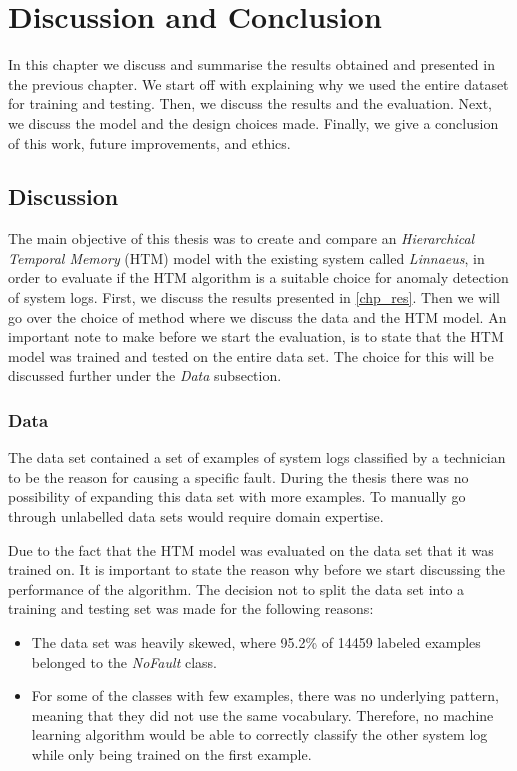 \chapter{Discussion and Conclusion}
\label{chp_disc}
In this chapter we discuss and summarise the results obtained and presented in the previous chapter. We start off with explaining why we used the entire dataset for training and testing. Then, we discuss the results and the evaluation. Next, we discuss the model and the design choices made. Finally, we give a conclusion of this work, future improvements, and ethics. 


\section{Discussion}
The main objective of this thesis was to create and compare an \textit{Hierarchical Temporal Memory} (HTM) model with the existing system called \textit{Linnaeus}, in order to evaluate if the HTM algorithm is a suitable choice for anomaly detection of system logs. First, we discuss the results presented in \autoref{chp_res}. Then we will go over the choice of method where we discuss the data and the HTM model. An important note to make before we start the evaluation, is to state that the HTM model was trained and tested on the entire data set. The choice for this will be discussed further under the \textit{Data} subsection.  

\subsection{Data}
The data set contained a set of examples of system logs classified by a technician to be the reason for causing a specific fault. During the thesis there was no possibility of expanding this data set with more examples. To manually go through unlabelled data sets would require domain expertise. 

Due to the fact that the HTM model was evaluated on the data set that it was trained on. It is important to state the reason why before we start discussing the performance of the algorithm. The decision not to split the data set into a training and testing set was made for the following reasons:

\begin{itemize}
    
    \item The data set was heavily skewed, where 95.2\% of 14459 labeled examples belonged to the \textit{NoFault} class.
    
    \item For some of the classes with few examples, there was no underlying pattern, meaning that they did not use the same vocabulary. Therefore, no machine learning algorithm would be able to correctly classify the other system log while only being trained on the first example. 
    
\end{itemize}


